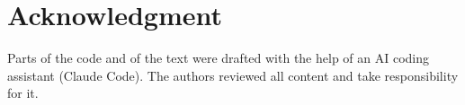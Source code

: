 \documentclass[conference]{IEEEtran}
\begin{document}
\section*{Acknowledgment}
Parts of the code and of the text were drafted with the help of an AI coding assistant (Claude Code). The authors reviewed all content and take responsibility for it.



\end{document}
